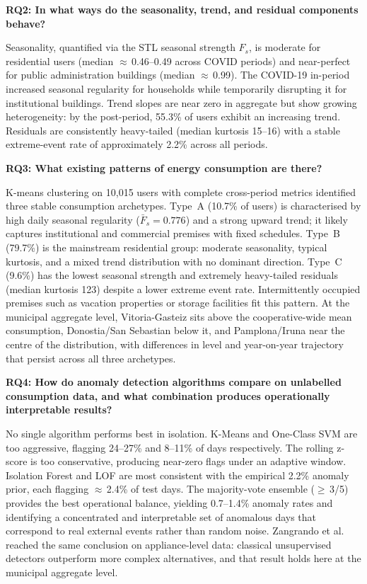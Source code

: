 ﻿\documentclass[12pt,reqno, twoside]{amsbook}
\numberwithin{figure}{chapter}
\numberwithin{table}{chapter}
\numberwithin{equation}{chapter}
\theoremstyle{plain}
\numberwithin{equation}{chapter}
\numberwithin{section}{chapter}
\begin{document}
\vspace{0.5\baselineskip}
\noindent\textbf{RQ2: In what ways do the seasonality, trend, and residual components behave?}

Seasonality, quantified via the \ac{STL} seasonal strength $F_s$, is moderate for residential users (median $\approx$\,0.46--0.49 across COVID periods) and near-perfect for public administration buildings (median $\approx$\,0.99). The COVID-19 in-period increased seasonal regularity for households while temporarily disrupting it for institutional buildings. Trend slopes are near zero in aggregate but show growing heterogeneity: by the post-period, 55.3\% of users exhibit an increasing trend. Residuals are consistently heavy-tailed (median kurtosis 15--16) with a stable extreme-event rate of approximately 2.2\% across all periods.

\vspace{0.5\baselineskip}
\noindent\textbf{RQ3: What existing patterns of energy consumption are there?}

K-means clustering on 10,015 users with complete cross-period metrics identified three stable consumption archetypes. Type~A (10.7\% of users) is characterised by high daily seasonal regularity ($\bar{F}_s = 0.776$) and a strong upward trend; it likely captures institutional and commercial premises with fixed schedules. Type~B (79.7\%) is the mainstream residential group: moderate seasonality, typical kurtosis, and a mixed trend distribution with no dominant direction. Type~C (9.6\%) has the lowest seasonal strength and extremely heavy-tailed residuals (median kurtosis 123) despite a lower extreme event rate. Intermittently occupied premises such as vacation properties or storage facilities fit this pattern. At the municipal aggregate level, Vitoria-Gasteiz sits above the cooperative-wide mean consumption, Donostia/San Sebastian below it, and Pamplona/Iruna near the centre of the distribution, with differences in level and year-on-year trajectory that persist across all three archetypes.

\vspace{0.5\baselineskip}
\noindent\textbf{RQ4: How do anomaly detection algorithms compare on unlabelled consumption data, and what combination produces operationally interpretable results?}

No single algorithm performs best in isolation. K-Means and One-Class \ac{SVM} are too aggressive, flagging 24--27\% and 8--11\% of days respectively. The rolling z-score is too conservative, producing near-zero flags under an adaptive window. Isolation Forest and \ac{LOF} are most consistent with the empirical 2.2\% anomaly prior, each flagging $\approx$\,2.4\% of test days. The majority-vote ensemble ($\geq$\,3/5) provides the best operational balance, yielding 0.7--1.4\% anomaly rates and identifying a concentrated and interpretable set of anomalous days that correspond to real external events rather than random noise. Zangrando et al. \cite{zangrando_anomaly_2022} reached the same conclusion on appliance-level data: classical unsupervised detectors outperform more complex alternatives, and that result holds here at the municipal aggregate level.
\end{document}
